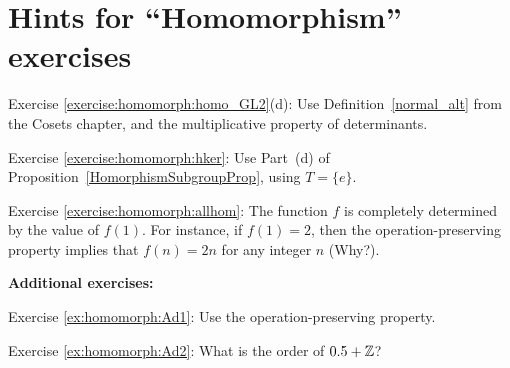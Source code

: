 \section{Hints for ``Homomorphism'' exercises}\label{sec:homomorph:hints} 


\noindent Exercise \ref{exercise:homomorph:homo_GL2}(d): 
Use Definition~\ref{normal_alt} from the Cosets chapter, and the multiplicative property of determinants.

\noindent Exercise \ref{exercise:homomorph:hker}:   Use Part~(d) of Proposition~\ref{HomorphismSubgroupProp}, using  $T=\{e\}$.

\noindent Exercise \ref{exercise:homomorph:allhom}: 
The function $f$ is completely determined by the value of $f(1)$.  For instance, if $f(1)=2$, then the operation-preserving property implies that $f(n)=2n$ for any integer $n$ (Why?).
\bigskip

\textbf{Additional exercises:}

\noindent Exercise \ref{ex:homomorph:Ad1}:  Use the operation-preserving property.

\noindent Exercise \ref{ex:homomorph:Ad2}: What is the order of $0.5 + \mathbb{Z}$?

